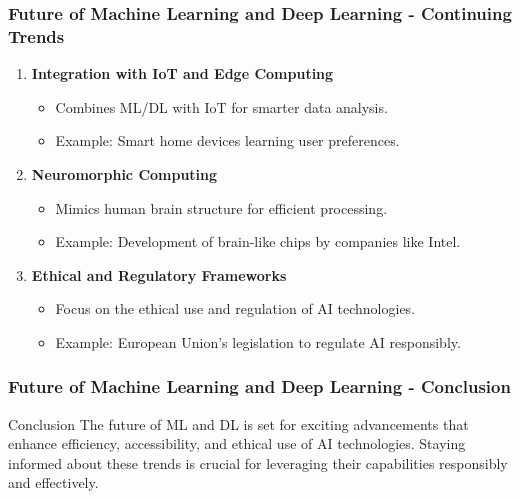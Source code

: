 \documentclass[aspectratio=169]{beamer}
\begin{document}
\begin{frame}[fragile]
    \frametitle{Future of Machine Learning and Deep Learning - Continuing Trends}
    \begin{enumerate}[resume]
        \item \textbf{Integration with IoT and Edge Computing}
            \begin{itemize}
                \item Combines ML/DL with IoT for smarter data analysis.
                \item Example: Smart home devices learning user preferences.
            \end{itemize}

        \item \textbf{Neuromorphic Computing}
            \begin{itemize}
                \item Mimics human brain structure for efficient processing.
                \item Example: Development of brain-like chips by companies like Intel.
            \end{itemize}

        \item \textbf{Ethical and Regulatory Frameworks}
            \begin{itemize}
                \item Focus on the ethical use and regulation of AI technologies.
                \item Example: European Union's legislation to regulate AI responsibly.
            \end{itemize}
    \end{enumerate}
\end{frame}

\begin{frame}[fragile]
    \frametitle{Future of Machine Learning and Deep Learning - Conclusion}
    \begin{block}{Conclusion}
        The future of ML and DL is set for exciting advancements that enhance efficiency, accessibility, and ethical use of AI technologies. 
        Staying informed about these trends is crucial for leveraging their capabilities responsibly and effectively.
    \end{block}
\end{frame}
\end{document}
